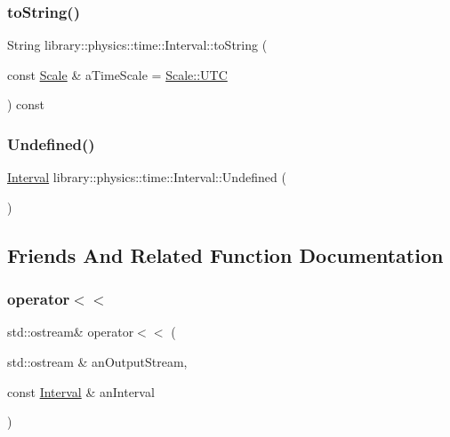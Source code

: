 \subsubsection{\texorpdfstring{to\+String()}{toString()}}
{\footnotesize\ttfamily String library\+::physics\+::time\+::\+Interval\+::to\+String (\begin{DoxyParamCaption}\item[{const \hyperlink{namespacelibrary_1_1physics_1_1time_a09d2bc9fbc7b0b5f92e1419bd655e6bb}{Scale} \&}]{a\+Time\+Scale = {\ttfamily \hyperlink{namespacelibrary_1_1physics_1_1time_a09d2bc9fbc7b0b5f92e1419bd655e6bba9234324ddf6b4176b57d803a925b7961}{Scale\+::\+U\+TC}} }\end{DoxyParamCaption}) const}

\mbox{\label{classlibrary_1_1physics_1_1time_1_1_interval_abe72d726e34919b4c8803e53af7fba66}} 
\subsubsection{\texorpdfstring{Undefined()}{Undefined()}}
{\footnotesize\ttfamily \hyperlink{classlibrary_1_1physics_1_1time_1_1_interval}{Interval} library\+::physics\+::time\+::\+Interval\+::\+Undefined (\begin{DoxyParamCaption}{ }\end{DoxyParamCaption})\hspace{0.3cm}{\ttfamily [static]}}



\subsection{Friends And Related Function Documentation}
\mbox{\label{classlibrary_1_1physics_1_1time_1_1_interval_a4671ce6746f99155561a1bdfade9749a}} 
\subsubsection{\texorpdfstring{operator$<$$<$}{operator<<}}
{\footnotesize\ttfamily std\+::ostream\& operator$<$$<$ (\begin{DoxyParamCaption}\item[{std\+::ostream \&}]{an\+Output\+Stream,  }\item[{const \hyperlink{classlibrary_1_1physics_1_1time_1_1_interval}{Interval} \&}]{an\+Interval }\end{DoxyParamCaption})\hspace{0.3cm}{\ttfamily [friend]}}



